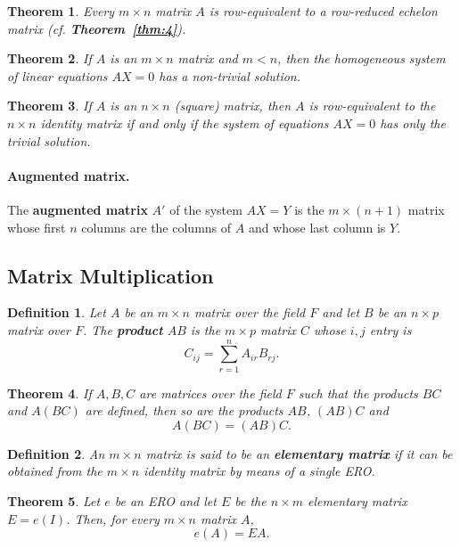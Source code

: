 \documentclass{article}
\newtheorem{theorem}{Theorem}
\newtheorem*{definition*}{Definition}
\begin{document}
\begin{theorem}
  Every $m \times n$ matrix $A$ is row-equivalent to a row-reduced echelon
  matrix (cf. \textbf{Theorem~\ref{thm:4}}).
\end{theorem}

\begin{theorem}
  If $A$ is an $m \times n$ matrix and $m < n$, then the homogeneous system of
  linear equations $AX = 0$ has a non-trivial solution.
\end{theorem}

\begin{theorem}
  If $A$ is an $n \times n$ (square) matrix, then $A$ is row-equivalent to the
  $n \times n$ identity matrix if and only if the system of equations $AX = 0$
  has only the trivial solution.
\end{theorem}

\paragraph{Augmented matrix.} The \textbf{augmented matrix} $A'$ of the system
$AX = Y$ is the $m \times (n + 1)$ matrix whose first $n$ columns are the
columns of $A$ and whose last column is $Y$.

\subsection{Matrix Multiplication}

\begin{definition*}
  Let $A$ be an $m \times n$ matrix over the field $F$ and let $B$ be an $n
  \times p$ matrix over $F$. The \textbf{product} $AB$ is the $m \times p$
  matrix $C$ whose $i, j$ entry is \[
    C_{ij} = \sum_{r=1}^n A_{ir}B_{rj}.
  \]
\end{definition*}

\begin{theorem}
  If $A, B, C$ are matrices over the field $F$ such that the products $BC$ and
  $A(BC)$ are defined, then so are the products $AB$, $(AB)C$ and \[
    A(BC) = (AB)C.
  \]
\end{theorem}

\begin{definition*}
  An $m \times n$ matrix is said to be an \textbf{elementary matrix} if it can
  be obtained from the $m \times n$ identity matrix by means of a single ERO.
\end{definition*}

\begin{theorem}
  Let $e$ be an ERO and let $E$ be the $n \times m$ elementary matrix $E =
  e(I)$. Then, for every $m \times n$ matrix $A$, \[
    e(A) = EA.
  \]
\end{theorem}
\end{document}

